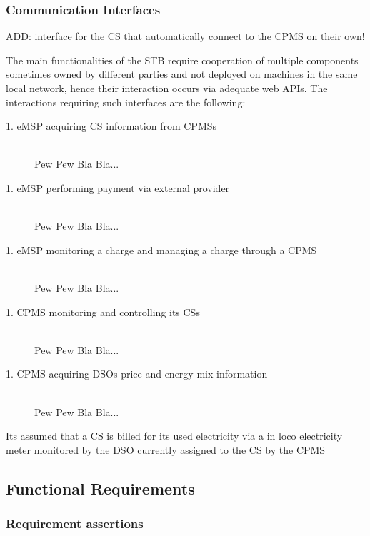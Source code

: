 \documentclass[11pt]{article}
\begin{document}
\subsubsection{Communication Interfaces}


ADD: interface for the CS that automatically connect to the CPMS on their own!


The main functionalities of the STB require cooperation of multiple components sometimes owned by different parties and not deployed on machines in the same local network, hence their interaction occurs via adequate web APIs. The interactions requiring such interfaces are the following:

\begin{description}
    \item [1. eMSP acquiring CS information from CPMSs] \hfill \\
        Pew Pew Bla Bla...
    \item [1. eMSP performing payment via external provider] \hfill \\
        Pew Pew Bla Bla...
    \item [1. eMSP monitoring a charge and managing a charge through a CPMS] \hfill \\
        Pew Pew Bla Bla...
    \item [1. CPMS monitoring and controlling its CSs] \hfill \\
        Pew Pew Bla Bla...
    \item [1. CPMS acquiring DSOs price and energy mix information] \hfill \\
        Pew Pew Bla Bla...
\end{description}

Its assumed that a CS is billed for its used electricity via a in loco electricity meter monitored by the DSO currently assigned to the CS by the CPMS

\subsection{Functional Requirements}

\subsubsection{Requirement assertions}
\end{document}
